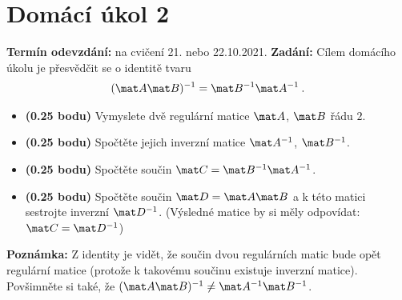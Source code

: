 \section*{Domácí úkol 2}
\textbf{Termín odevzdání:} na cvičení 21. nebo 22.10.2021.
\newline
\textbf{Zadání:} Cílem domácího úkolu je přesvědčit se o identitě tvaru \begin{align*}
    (\mat A \mat B)^{-1} = \mat B^{-1} \mat A^{-1} \:.
\end{align*}

\begin{itemize}
    \item \textbf{(0.25 bodu)} Vymyslete dvě  regulární matice $\mat A$, $\mat B$ řádu $2$.
    \item \textbf{(0.25 bodu)} Spočtěte jejich inverzní matice $\mat A^{-1}$, $\mat B^{-1}$.
    \item \textbf{(0.25 bodu)} Spočtěte součin $\mat C = \mat B^{-1} \mat A^{-1}$.
    \item \textbf{(0.25 bodu)} Spočtěte součin $\mat D = \mat A \mat B$ a k této matici sestrojte inverzní $\mat D^{-1}$. \newline(Výsledné matice by si měly odpovídat: $\mat C = \mat D^{-1}$)
\end{itemize}

\textbf{Poznámka:} Z identity je vidět, že součin dvou regulárních matic bude opět regulární matice (protože k takovému součinu existuje inverzní matice). Povšimněte si také, že $(\mat A \mat B)^{-1} \neq \mat A^{-1} \mat B^{-1}$.